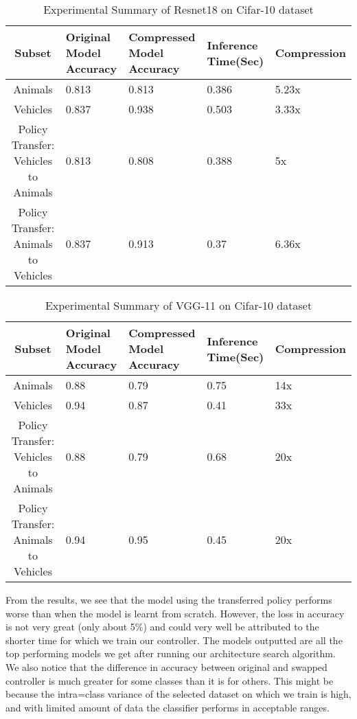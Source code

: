 \documentclass[../main]{subfiles}
\begin{document}
\begin{table*}
\caption{Experimental Summary of Resnet18 on Cifar-10 dataset}
\centering
\begin{tabular}{|c|p{2.3cm}|p{2.5cm}|p{1.8cm}|p{2cm}|}
 \hline
 Subset & Original Model Accuracy & Compressed Model Accuracy & Inference Time(Sec) & Compression\\
 \hline
 Animals & 0.813 & 0.813 & 0.386 & 5.23x \\
 \hline
 Vehicles & 0.837 & 0.938  & 0.503 & 3.33x \\
 \hline
 Policy Transfer: Vehicles to Animals  & 0.813 & 0.808 & 0.388 & 5x \\
 \hline 
 Policy Transfer: Animals to Vehicles & 0.837 & 0.913 & 0.37 & 6.36x \\
 \hline
\end{tabular}
\end{table*}

\begin{table*}
\caption{Experimental Summary of VGG-11 on Cifar-10 dataset}
\centering
\begin{tabular}{|c|p{2.3cm}|p{2.5cm}|p{1.8cm}|p{2cm}|}
 \hline
 Subset & Original Model Accuracy & Compressed Model Accuracy & Inference Time(Sec) & Compression\\
 \hline
 Animals & 0.88 & 0.79 & 0.75 & 14x \\
 \hline
 Vehicles & 0.94 & 0.87  & 0.41 & 33x \\
 \hline
 Policy Transfer: Vehicles to Animals  & 0.88 & 0.79 & 0.68 & 20x \\
 \hline 
 Policy Transfer: Animals to Vehicles & 0.94 & 0.95 & 0.45 & 20x \\
 \hline
\end{tabular}
\end{table*}

From the results, we see that the model using the transferred policy performs worse than when the model is learnt from scratch. However, the loss in accuracy is not very great (only about 5\%) and could very well be attributed to the shorter time for which we train our controller. The models outputted are all the top performing models we get after running our architecture search algorithm. \\
We also notice that the difference in accuracy between original and swapped controller is much greater for some classes than it is for others. This might be because the intra=class variance of the selected dataset on which we train is high, and with limited amount of data the classifier performs in acceptable ranges. 
\end{document}
